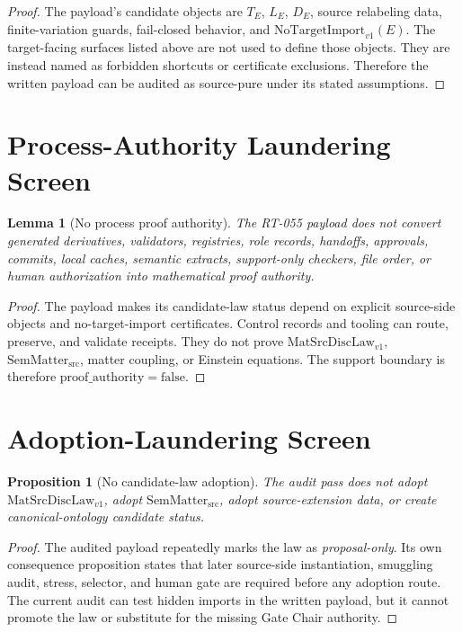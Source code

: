 \documentclass[11pt]{article}
\newcommand{\MatSrcDiscLaw}{\mathrm{MatSrcDiscLaw}_{v1}}
\newcommand{\SemMatterSrc}{\mathrm{SemMatter}_{\mathrm{src}}}
\newcommand{\NoTarget}{\mathrm{NoTargetImport}_{v1}}
\newcommand{\ProofAuthFalse}{\mathrm{proof\_authority=false}}
\newtheorem{lemma}{Lemma}
\newtheorem{proposition}{Proposition}
\begin{document}
\begin{proof}
The payload's candidate objects are \(T_E\), \(L_E\), \(D_E\), source
relabeling data, finite-variation guards, fail-closed behavior, and
\(\NoTarget(E)\).  The target-facing surfaces listed above are not used to
define those objects.  They are instead named as forbidden shortcuts or
certificate exclusions.  Therefore the written payload can be audited as
source-pure under its stated assumptions.
\end{proof}

\section{Process-Authority Laundering Screen}

\begin{lemma}[No process proof authority]
The RT-055 payload does not convert generated derivatives, validators,
registries, role records, handoffs, approvals, commits, local caches,
semantic extracts, support-only checkers, file order, or human authorization
into mathematical proof authority.
\end{lemma}

\begin{proof}
The payload makes its candidate-law status depend on explicit source-side
objects and no-target-import certificates.  Control records and tooling can
route, preserve, and validate receipts.  They do not prove
\(\MatSrcDiscLaw\), \(\SemMatterSrc\), matter coupling, or Einstein equations.
The support boundary is therefore \(\ProofAuthFalse\).
\end{proof}

\section{Adoption-Laundering Screen}

\begin{proposition}[No candidate-law adoption]
The audit pass does not adopt \(\MatSrcDiscLaw\), adopt \(\SemMatterSrc\),
adopt source-extension data, or create canonical-ontology candidate status.
\end{proposition}

\begin{proof}
The audited payload repeatedly marks the law as \emph{proposal-only}.  Its
own consequence proposition states that later source-side instantiation,
smuggling audit, stress, selector, and human gate are required before any
adoption route.  The current audit can test hidden imports in the written
payload, but it cannot promote the law or substitute for the missing Gate
Chair authority.
\end{proof}
\end{document}
